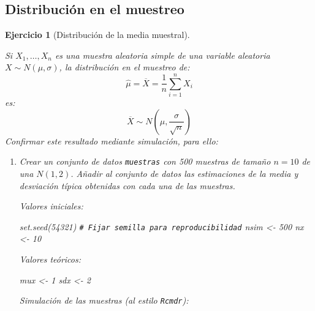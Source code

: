 \documentclass[
]{book}
\newenvironment{Shaded}{\begin{snugshade}}{\end{snugshade}}
\newcommand{\CommentTok}[1]{\textcolor[rgb]{0.56,0.35,0.01}{\textit{#1}}}
\newcommand{\DecValTok}[1]{\textcolor[rgb]{0.00,0.00,0.81}{#1}}
\newcommand{\FunctionTok}[1]{\textcolor[rgb]{0.00,0.00,0.00}{#1}}
\newcommand{\NormalTok}[1]{#1}
\newcommand{\OtherTok}[1]{\textcolor[rgb]{0.56,0.35,0.01}{#1}}
\theoremstyle{break}
\newtheorem{exercise}{Ejercicio}[chapter]
\theoremstyle{nonumberplain}
\renewcommand{\CommentTok}[1]{\textcolor[rgb]{0.41,0.41,0.41}{\texttt{#1}}}
\begin{document}
\hypertarget{distribuciuxf3n-en-el-muestreo}{%
\subsection{Distribución en el muestreo}\label{distribuciuxf3n-en-el-muestreo}}

\begin{exercise}[Distribución de la media muestral]
\protect\hypertarget{exr:distr-media}{}\label{exr:distr-media}

Si \(X_{1},\ldots,X_{n}\) es una muestra aleatoria simple de una
variable aleatoria \(X \sim N\left( \mu, \sigma \right)\), la
distribución en el muestreo de:
\[\hat{\mu}=\overline{X}=\dfrac{1}{n}\sum_{i=1}^{n}X_{i}\]
es:
\[\overline{X} \sim N\left(  \mu,\dfrac{\sigma}{\sqrt{n}}\right)\]
Confirmar este resultado mediante simulación, para ello:

\begin{enumerate}
\def\labelenumi{\alph{enumi})}
\item
  Crear un conjunto de datos \texttt{muestras} con 500 muestras de tamaño
  \(n=10\) de una \(N(1,2)\). Añadir al conjunto de datos las
  estimaciones de la media y desviación típica obtenidas con cada
  una de las muestras.

  Valores iniciales:

\begin{Shaded}
\begin{Highlighting}[]
\FunctionTok{set.seed}\NormalTok{(}\DecValTok{54321}\NormalTok{) }\CommentTok{\# Fijar semilla para reproducibilidad}
\NormalTok{nsim }\OtherTok{\textless{}{-}} \DecValTok{500}
\NormalTok{nx }\OtherTok{\textless{}{-}} \DecValTok{10}
\end{Highlighting}
\end{Shaded}

  Valores teóricos:

\begin{Shaded}
\begin{Highlighting}[]
\NormalTok{mux }\OtherTok{\textless{}{-}} \DecValTok{1}
\NormalTok{sdx }\OtherTok{\textless{}{-}} \DecValTok{2}
\end{Highlighting}
\end{Shaded}

  Simulación de las muestras (al estilo \texttt{Rcmdr}):


\end{enumerate}
\end{exercise}
\end{document}
